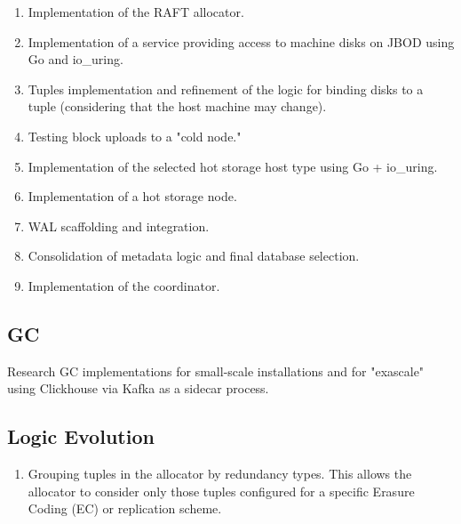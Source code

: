 \documentclass[a4paper,12pt]{article}
\begin{document}
    \begin{enumerate}
        \item Implementation of the RAFT allocator.
        \item Implementation of a service providing access to machine disks on JBOD using Go and io\_uring.
        \item Tuples implementation and refinement of the logic for binding disks to a tuple (considering that the host machine may change).
        \item Testing block uploads to a "cold node."
        \item Implementation of the selected hot storage host type using Go + io\_uring.
        \item Implementation of a hot storage node.
        \item WAL scaffolding and integration.
        \item Consolidation of metadata logic and final database selection.
        \item Implementation of the coordinator.
    \end{enumerate}

    \subsection{GC}

    Research GC implementations for small-scale installations and for "exascale" using Clickhouse via Kafka as a sidecar process.

    \subsection{Logic Evolution}
    \begin{enumerate}
        \item Grouping tuples in the allocator by redundancy types. This allows the allocator to consider only those tuples configured for a specific Erasure Coding (EC) or replication scheme.
    \end{enumerate}
\end{document}
